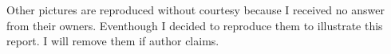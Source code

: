 \begin{appendices}
\begin{en}
        Other pictures are reproduced without courtesy because I received no answer from their owners.
        Eventhough I decided to reproduce them to illustrate this report.
        I will remove them if author claims.
        
\end{en}

\end{appendices}


